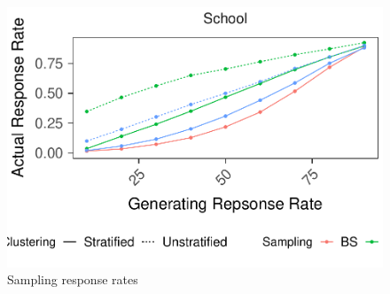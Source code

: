 \documentclass[man,floatsintext]{apa6}
\begin{document}
\begin{figure}
\centering
\includegraphics{Results_files/figure-latex/unnamed-chunk-13-1.pdf}
\caption{\label{fig:unnamed-chunk-13}Sampling response rates}
\end{figure}
\end{document}
